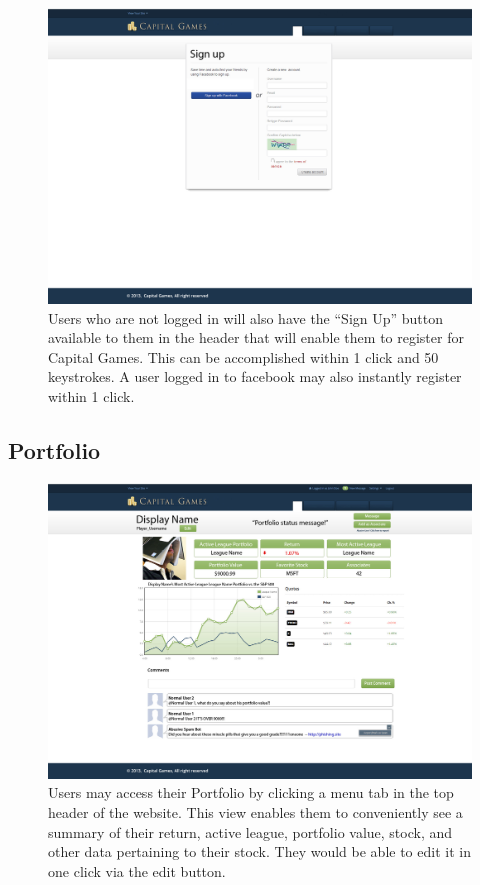 {
\begin{figure}
\centering
\includegraphics[width=5.5in]{./mockups/JPEG/Register.jpg}
\caption{Users who are not logged in will also have the ``Sign Up'' button available to them in the header that will enable them to register for Capital Games. This can be accomplished within 1 click and 50 keystrokes. A user logged in to facebook may also instantly register within 1 click.}
\end{figure}
}

\subsection{Portfolio}
{
\begin{figure}
\centering
\includegraphics[width=5.5in]{./mockups/JPEG/Portfolio.jpg}
\caption{Users may access their Portfolio by clicking a menu tab in the top header of the website. This view enables them to conveniently see a summary of their return, active league, portfolio value, stock, and other data pertaining to their stock. They would be able to edit it in one click via the edit button. }
\end{figure}
}

